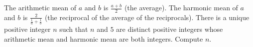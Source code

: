 The arithmetic mean of $a$ and $b$ is $\frac{a+b}{2}$ (the average). The harmonic mean of $a$ and $b$ is $\frac{2}{\frac{1}{a}+\frac{1}{b}}$ (the reciprocal of the average of the reciprocals). There is a unique positive integer $n$ such that $n$ and $5$ are distinct positive integers whose arithmetic mean and harmonic mean are both integers. Compute $n$.